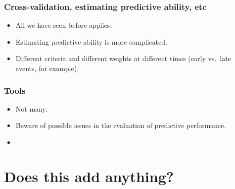 \begin{frame}
  \frametitle{Cross-validation, estimating predictive ability, etc}
  \begin{itemize}
  \item All we have seen before applies.
  \item Estimating predictive ability is more complicated.
  \item Different criteria and different weights at different times (early
    vs.\ late events, for example).
  \end{itemize}
\end{frame}


\begin{frame}
  \frametitle{Tools}
  \begin{itemize}
  \item Not many.
  \item Beware of possible issues in the evaluation of predictive performance.
  \item {}
  \end{itemize}
\end{frame}

\section[Added value]{Does this add anything?}






